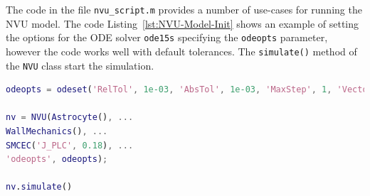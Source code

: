 The code in the file \texttt{nvu\_script.m} provides a number of use-cases for running the NVU model. The code Listing~\ref{lst:NVU-Model-Init} shows an example of setting the options for the ODE solver \texttt{ode15s} specifying the \texttt{odeopts} parameter, however the code works well with default tolerances. The \texttt{simulate()} method of the \texttt{NVU} class start the simulation.

\begin{lstlisting}[language=Matlab,caption={Initialisation of the NVU model components.},label={lst:NVU-Model-Init},frameround=tttt,belowcaptionskip=10pt]
odeopts = odeset('RelTol', 1e-03, 'AbsTol', 1e-03, 'MaxStep', 1, 'Vectorized', 1);

nv = NVU(Astrocyte(), ...
WallMechanics(), ...
SMCEC('J_PLC', 0.18), ...
'odeopts', odeopts);

nv.simulate()
\end{lstlisting}


